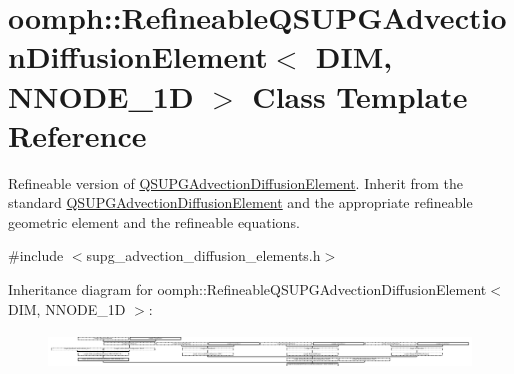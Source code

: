 \hypertarget{classoomph_1_1RefineableQSUPGAdvectionDiffusionElement}{}\section{oomph\+:\+:Refineable\+Q\+S\+U\+P\+G\+Advection\+Diffusion\+Element$<$ D\+IM, N\+N\+O\+D\+E\+\_\+1D $>$ Class Template Reference}
\label{classoomph_1_1RefineableQSUPGAdvectionDiffusionElement}


Refineable version of \hyperlink{classoomph_1_1QSUPGAdvectionDiffusionElement}{Q\+S\+U\+P\+G\+Advection\+Diffusion\+Element}. Inherit from the standard \hyperlink{classoomph_1_1QSUPGAdvectionDiffusionElement}{Q\+S\+U\+P\+G\+Advection\+Diffusion\+Element} and the appropriate refineable geometric element and the refineable equations.  




{\ttfamily \#include $<$supg\+\_\+advection\+\_\+diffusion\+\_\+elements.\+h$>$}

Inheritance diagram for oomph\+:\+:Refineable\+Q\+S\+U\+P\+G\+Advection\+Diffusion\+Element$<$ D\+IM, N\+N\+O\+D\+E\+\_\+1D $>$\+:\begin{figure}[H]
\begin{center}
\leavevmode
\includegraphics[height=0.952381cm]{classoomph_1_1RefineableQSUPGAdvectionDiffusionElement}
\end{center}
\end{figure}
